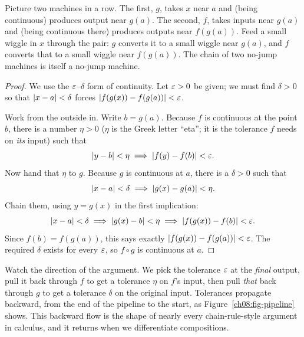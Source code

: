 \begin{intuitionbox}
Picture two machines in a row. The first, $g$, takes $x$ near $a$ and (being continuous)
produces output near $g(a)$. The second, $f$, takes inputs near $g(a)$ and (being
continuous there) produces outputs near $f(g(a))$. Feed a small wiggle in $x$ through the
pair: $g$ converts it to a small wiggle near $g(a)$, and $f$ converts that to a small
wiggle near $f(g(a))$. The chain of two no-jump machines is itself a no-jump machine.
\end{intuitionbox}

\begin{proof}
We use the $\varepsilon$--$\delta$ form of continuity. Let $\varepsilon>0$ be given; we must find
$\delta>0$ so that $\lvert x-a\rvert<\delta$ forces $\lvert f(g(x))-f(g(a))\rvert<\varepsilon$.

Work from the outside in. Write $b=g(a)$. Because $f$ is continuous at the point $b$,
there is a number $\eta>0$ ($\eta$ is the Greek letter ``eta''; it is the tolerance $f$
needs on \emph{its} input) such that
\[
  \lvert y-b\rvert<\eta \implies \lvert f(y)-f(b)\rvert<\varepsilon.
\]
Now hand that $\eta$ to $g$. Because $g$ is continuous at $a$, there is a $\delta>0$ such
that
\[
  \lvert x-a\rvert<\delta \implies \lvert g(x)-g(a)\rvert<\eta.
\]
Chain them, using $y=g(x)$ in the first implication:
\[
  \lvert x-a\rvert<\delta
  \implies \lvert g(x)-b\rvert<\eta
  \implies \lvert f(g(x))-f(b)\rvert<\varepsilon.
\]
Since $f(b)=f(g(a))$, this says exactly
$\lvert f(g(x))-f(g(a))\rvert<\varepsilon$. The required $\delta$ exists for every $\varepsilon$, so $f\circ g$
is continuous at $a$.
\end{proof}

\begin{focusbox}
Watch the direction of the argument. We pick the tolerance $\varepsilon$ at the \emph{final}
output, pull it back through $f$ to get a tolerance $\eta$ on $f$'s input, then pull
\emph{that} back through $g$ to get a tolerance $\delta$ on the original input. Tolerances
propagate backward, from the end of the pipeline to the start, as
Figure~\ref{ch08:fig-pipeline} shows. This backward flow is the shape of nearly every
chain-rule-style argument in calculus, and it returns when we differentiate compositions.
\end{focusbox}

